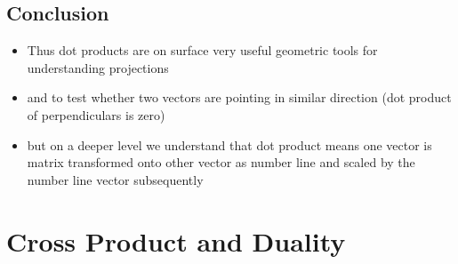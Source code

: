 \documentclass[a4paper]{article}
\begin{document}
\subsection{Conclusion}
\begin{itemize}
	\item Thus dot products are on surface very useful
	      geometric tools for understanding projections
	\item and to test whether two vectors are pointing in
	      similar direction (dot product of perpendiculars is
	      zero)
	\item but on a deeper level we understand that dot
	      product means one vector is matrix transformed onto
	      other vector as number line and scaled by the number line
	      vector subsequently
\end{itemize}

\newpage
\section{Cross Product and Duality}
\end{document}

